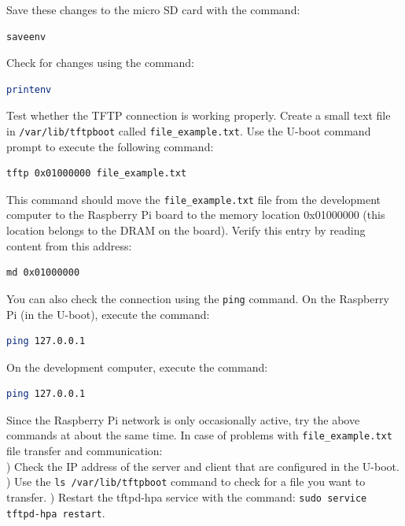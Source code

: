 \documentclass[11pt]{article}
\begin{document}
Save these changes to the micro SD card with the command:
\begin{lstlisting}[language=bash]
saveenv
\end{lstlisting}
Check for changes using the command:
\begin{lstlisting}[language=bash]
printenv
\end{lstlisting}
Test whether the TFTP connection is working properly. Create a small text file
 in \texttt{/var/lib/tftpboot} called \texttt{file\_example.txt}. Use the
 U-boot command prompt to execute the following command:
\begin{lstlisting}[language=bash]
tftp 0x01000000 file_example.txt
\end{lstlisting}
This command should move the \texttt{file\_example.txt} file from the
 development computer to the Raspberry Pi board to the memory location
 0x01000000 (this location belongs to the DRAM on the board). Verify this entry
 by reading content from this address:
\begin{lstlisting}[language=bash]
md 0x01000000
\end{lstlisting}
You can also check the connection using the \texttt{ping} command. On the
 Raspberry Pi (in the U-boot), execute the command:
\begin{lstlisting}[language=bash]
ping 127.0.0.1
\end{lstlisting}
On the development computer, execute the command:
\begin{lstlisting}[language=bash]
ping 127.0.0.1
\end{lstlisting}
Since the Raspberry Pi network is only occasionally active, try the above
 commands at about the same time. In case of problems with
 \texttt{file\_example.txt} file transfer and communication:\\
) Check the IP address of the server and client that are configured in the
 U-boot.
) Use the \texttt{ls /var/lib/tftpboot} command to check for a file you want
 to transfer.
) Restart the tftpd-hpa service with the command:
 \texttt{sudo service tftpd-hpa restart}.
\end{document}
